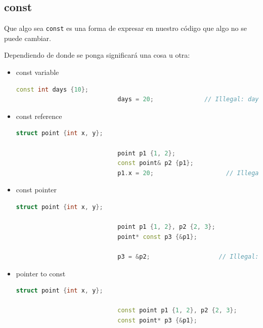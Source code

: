 \documentclass[12pt, fleqn]{report}                             %
\theoremstyle{break}                                            %
\newcommand{\textCode}[1]  { \texttt{#1} }                      %
\begin{document}
            \subsection{const}

                Que algo sea \textCode{const} es una forma de expresar en nuestro código que
                algo no se puede cambiar.
                
                Dependiendo de donde se ponga significará una cosa u otra:
                \begin{itemize}
                    \item const variable
                        \begin{lstlisting}[language=C++, gobble=28]
                            const int days {10};
                            days = 20;              // Illegal: days cannot change
                        \end{lstlisting}

                    \item const reference
                        \begin{lstlisting}[language=C++, gobble=28]
                            struct point {int x, y};
        
                            point p1 {1, 2};
                            const point& p2 {p1};
                            p1.x = 20;                    // Illegal: point cannot change
                        \end{lstlisting}

                    \item const pointer
                        \begin{lstlisting}[language=C++, gobble=28]
                            struct point {int x, y};

                            point p1 {1, 2}, p2 {2, 3};
                            point* const p3 {&p1};

                            p3 = &p2;                   // Illegal: p3 cannot change
                        \end{lstlisting}

                    \item pointer to const
                        \begin{lstlisting}[language=C++, gobble=28]
                            struct point {int x, y};

                            const point p1 {1, 2}, p2 {2, 3};
                            const point* p3 {&p1};
                            

\end{lstlisting}
\end{itemize}
\end{document}
